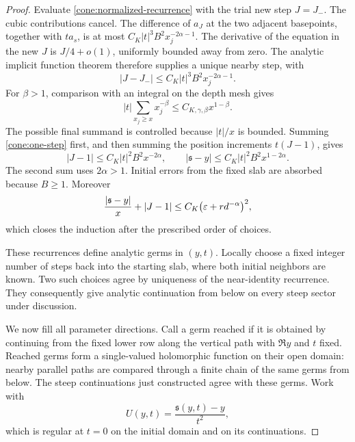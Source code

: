 \begin{proof}
Evaluate \eqref{cone:normalized-recurrence} with the trial new step
\(J=J_-\). The cubic contributions cancel. The difference of
\(a_J\) at the two adjacent basepoints, together with \(ta_s\), is at
most
\(C_K|t|^3B^2x_j^{-2\alpha-1}\). The derivative of the equation in
the new \(J\) is \(J/4+o(1)\), uniformly bounded away from zero.
The analytic implicit function theorem therefore supplies a unique
nearby step, with
\begin{equation}\label{cone:one-step}
 |J-J_-|\le C_K|t|^3B^2x_j^{-2\alpha-1}.
\end{equation}
For \(\beta>1\), comparison with an integral on the depth mesh gives
\[
 |t|\sum_{x_j\ge x}x_j^{-\beta}\le C_{K,\gamma,\beta}x^{1-\beta}.
\]
The possible final summand is controlled because \(|t|/x\) is bounded.
Summing \eqref{cone:one-step} first, and then summing the position
increments \(t(J-1)\), gives
\begin{equation}\label{cone:steep-estimates}
 |J-1|\le C_K|t|^2B^2x^{-2\alpha},\qquad
 |\mathfrak s-y|\le C_K|t|^2B^2x^{1-2\alpha}.
\end{equation}
The second sum uses \(2\alpha>1\). Initial errors from the fixed slab
are absorbed because \(B\ge1\). Moreover
\[
 \frac{|\mathfrak s-y|}{x}+|J-1|
 \le C_K\bigl(\varepsilon+rd^{-\alpha}\bigr)^2,
\]
which closes the induction after the prescribed order of choices.

These recurrences define analytic germs in \((y,t)\). Locally choose a
fixed integer number of steps back into the starting slab, where both
initial neighbors are known. Two such choices agree by uniqueness of
the near-identity recurrence. They consequently give analytic
continuation from below on every steep sector under discussion.

We now fill all parameter directions. Call a germ reached if it is
obtained by continuing from the fixed lower row along the vertical path
with \(\Re y\) and \(t\) fixed. Reached germs form a single-valued
holomorphic function on their open domain: nearby parallel paths are
compared through a finite chain of the same germs from below. The steep
continuations just constructed agree with these germs. Work with
\[
 U(y,t)=\frac{\mathfrak s(y,t)-y}{t^2},
\]
which is regular at \(t=0\) on the initial domain and on its
continuations.


\end{proof}

